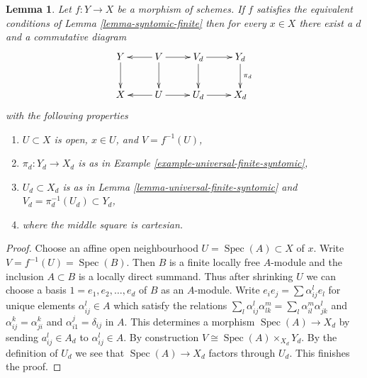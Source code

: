 \documentclass[10pt,a4paper]{amsart}
\theoremstyle{plain}
\newtheorem{lemma}[subsection]{Lemma}
\theoremstyle{definition}
\theoremstyle{remark}
\numberwithin{equation}{subsection}
\def\Spec{\mathop{\mathrm{Spec}}}
\begin{document}
\begin{lemma}
\label{lemma-locally-comes-from-universal-finite}
Let $f : Y \to X$ be a morphism of schemes. If $f$ satisfies the equivalent
conditions of Lemma \ref{lemma-syntomic-finite} then for every
$x \in X$ there exist a $d$ and a commutative diagram
$$
\xymatrix{
Y \ar[d] &
V \ar[d] \ar[l] \ar[r] &
V_d \ar[d] \ar[r] &
Y_d \ar[d]^{\pi_d}\\
X &
U \ar[l] \ar[r] &
U_d \ar[r] &
X_d
}
$$
with the following properties
\begin{enumerate}
\item $U \subset X$ is open, $x \in U$, and $V = f^{-1}(U)$,
\item $\pi_d : Y_d \to X_d$ is as in
Example \ref{example-universal-finite-syntomic},
\item $U_d \subset X_d$ is as in Lemma \ref{lemma-universal-finite-syntomic}
and $V_d = \pi_d^{-1}(U_d) \subset Y_d$,
\item where the middle square is cartesian.
\end{enumerate}
\end{lemma}

\begin{proof}
Choose an affine open neighbourhood $U = \Spec(A) \subset X$ of $x$.
Write $V = f^{-1}(U) = \Spec(B)$. Then $B$ is a finite locally free
$A$-module and the inclusion $A \subset B$ is a locally direct summand.
Thus after shrinking $U$ we can choose a basis $1 = e_1, e_2, \ldots, e_d$
of $B$ as an $A$-module. Write
$e_i e_j = \sum \alpha_{ij}^l e_l$ for unique
elements $\alpha_{ij}^l \in A$ which satisfy the relations
$\sum_l \alpha_{ij}^l \alpha_{lk}^m = \sum_l \alpha_{il}^m \alpha _{jk}^l$
and $\alpha_{ij}^k = \alpha_{ji}^k$ and $\alpha_{i1}^j = \delta_{ij}$
in $A$. This determines a morphism $\Spec(A) \to X_d$ by sending
$a_{ij}^l \in A_d$ to $\alpha_{ij}^l \in A$. By construction
$V \cong \Spec(A) \times_{X_d} Y_d$. By the definition of $U_d$
we see that $\Spec(A) \to X_d$ factors through $U_d$. This
finishes the proof.
\end{proof}
\end{document}
